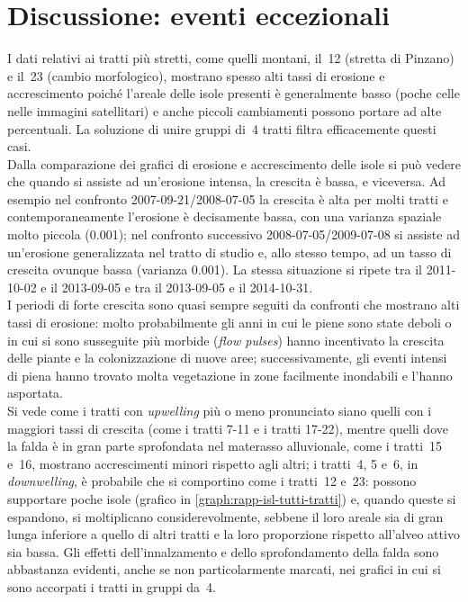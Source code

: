 \section{Discussione: eventi eccezionali}
I dati relativi ai tratti più stretti, come quelli montani, il~12 (stretta di Pinzano) e il~23 (cambio morfologico), mostrano spesso alti tassi di erosione e accrescimento poiché l'areale delle isole presenti è generalmente basso (poche celle nelle immagini satellitari) e anche piccoli cambiamenti possono portare ad alte percentuali.
La soluzione di unire gruppi di~4 tratti filtra efficacemente questi casi.
\\
Dalla comparazione dei grafici di erosione e accrescimento delle isole si può vedere che quando si assiste ad un'erosione intensa, la crescita è bassa, e viceversa.
Ad esempio nel confronto 2007-09-21/2008-07-05 la crescita è alta per molti tratti e contemporaneamente l'erosione è decisamente bassa, con una varianza spaziale molto piccola (\num{0.001}); nel confronto successivo 2008-07-05/2009-07-08 si assiste ad un'erosione generalizzata nel tratto di studio e, allo stesso tempo, ad un tasso di crescita ovunque bassa (varianza \num{0.001}).
La stessa situazione si ripete tra il 2011-10-02 e il 2013-09-05 e tra il 2013-09-05 e il 2014-10-31.
\\
I periodi di forte crescita sono quasi sempre seguiti da confronti che mostrano alti tassi di erosione: molto probabilmente gli anni in cui le piene sono state deboli o in cui si sono susseguite più morbide (\emph{flow pulses}) hanno incentivato la crescita delle piante e la colonizzazione di nuove aree; successivamente, gli eventi intensi di piena hanno trovato molta vegetazione in zone facilmente inondabili e l'hanno asportata.
\\
Si vede come i tratti con \emph{upwelling} più o meno pronunciato siano quelli con i maggiori tassi di crescita (come i tratti 7-11 e i tratti 17-22), mentre quelli dove la falda è in gran parte sprofondata nel materasso alluvionale, come i tratti~15 e~16, mostrano accrescimenti minori rispetto agli altri;
i tratti~4, 5 e~6, in \emph{downwelling}, è probabile che si comportino come i tratti~12 e~23: possono supportare poche isole (grafico in \cref{graph:rapp-isl-tutti-tratti}) e, quando queste si espandono, si moltiplicano considerevolmente, sebbene il loro areale sia di gran lunga inferiore a quello di altri tratti e la loro proporzione rispetto all'alveo attivo sia bassa.
Gli effetti dell'innalzamento e dello sprofondamento della falda sono abbastanza evidenti, anche se non particolarmente marcati, nei grafici in cui si sono accorpati i tratti in gruppi da~4.

